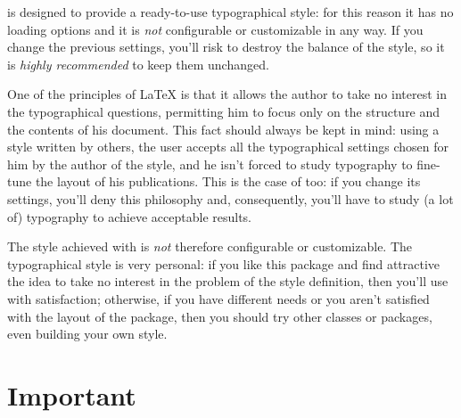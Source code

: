 \arsclassica{} is designed  to provide a ready-to-use typographical style: for this reason it has no loading options and it is \emph{not} configurable or customizable in any way. If you change the previous settings, you'll risk to destroy the balance of the style, so it is \emph{highly recommended} to keep them unchanged.

One of the principles of \LaTeX{} is that it allows the author to take no interest in the typographical questions, permitting him to focus only on the structure and the contents of his document. This fact should always be kept in mind: using a style written by others, the user accepts all the typographical settings chosen for him by the author of the style, and he isn't forced to study typography to fine-tune the layout of his publications. This is the case of \arsclassica{} too: if you change its settings, you'll deny this philosophy and, consequently, you'll have to study (a lot of) typography to achieve acceptable results.

The style achieved with \arsclassica{} is \emph{not} therefore configurable or customizable. The typographical style is very personal: if you like this package and find attractive the idea to take no interest in the problem of the style definition, then you'll use \arsclassica{} with satisfaction; otherwise, if you have different needs or you aren't satisfied with the layout of the package, then you should try other classes or packages, even building your own style.



\section{Important}

